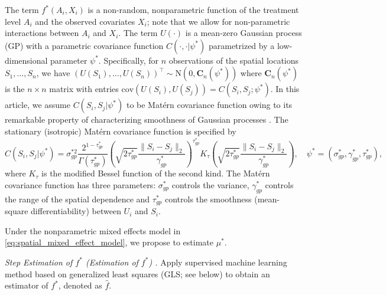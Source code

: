 \documentclass[12pt]{article}
\makeatletter
\newcommand{\CP}[1]{{\color{purple}From Chan: #1}}
\newcounter{stepcounter}
\newenvironment{step}[1][] %
  {%
   \par\addvspace{\medskipamount}%
   \refstepcounter{stepcounter}%
   \noindent %
   \textit{%
     Step \thestepcounter%
     \def\@optarg{#1}%
     \ifx\@optarg\@empty %
     \else
        \space(#1)%
     \fi %
     .%
   }%
   \quad %
  }%
  {%
   \par\addvspace{\medskipamount}%
  }
\makeatother
\begin{document}

The term $f^*(A_i,X_i)$ is a non-random, nonparametric function of the treatment level $A_i$ and the observed covariates $X_i$; note that we allow for non-parametric interactions between $A_i$ and $X_i$. The term $U(\cdot)$ is a mean-zero Gaussian process (GP) with a parametric covariance function $C(\cdot,\cdot|\psi^*)$ parametrized by a low-dimensional parameter $\psi^*$.  Specifically, for $n$ observations of the spatial locations $S_1,\ldots,S_n$, we have $(U(S_1),\ldots,U(S_n))^\top \sim \mathrm{N}(0,\mathbf{C}_n(\psi^*))$ where $\mathbf{C}_n(\psi^*)$ is the $n\times n$ matrix with entries $\mathrm{cov}(U(S_i),U(S_j)) = C(S_i,S_j;\psi^*)$. In this article, we assume $C(S_i,S_j|\psi^*)$ to be Mat\'ern covariance function owing to its remarkable property of characterizing smoothness of Gaussian processes  \citep{stein1999interpolation}. The stationary (isotropic) Matérn covariance function is specified by
\begin{equation}\label{eq:matern}
    C(S_i, S_j|\psi^*) = \sigma_{gp}^{*2}\frac{2^{1-\tau_{gp}^{*}}}{\Gamma(\tau_{gp}^{*})} \left( \sqrt{2\tau_{gp}^{*}} \frac{\|S_i - S_j\|_2}{\gamma_{gp}^{*}} \right)^{\tau_{gp}^{*}} K_\tau \left( \sqrt{2\tau_{gp}^{*}} \frac{\|S_i - S_j\|_2}{\gamma_{gp}^{*}} \right),\quad  \psi^* = (\sigma_{gp}^{*},\gamma_{gp}^{*},\tau_{gp}^{*}),
\end{equation}
where $K_\tau$ is the modified Bessel function of the second kind. 
The Matérn covariance function has three parameters: $\sigma_{gp}^{*}$ controls the variance, $\gamma_{gp}^{*}$ controls the range of the spatial dependence and $\tau_{gp}^{*}$ controls the smoothness (mean-square differentiability) between $U_i$ and $S_i$.


Under the nonparametric mixed effects model in \eqref{eq:spatial_mixed_effect_model}, we propose to estimate $\mu^*$.
\begin{step}[Estimation of $f^*$]\label{step:regression} Apply supervised machine learning method based on generalized least squares (GLS; see below) to obtain an estimator of $f^*$, denoted as $\widehat{f}$.
\end{step}
\end{document}
